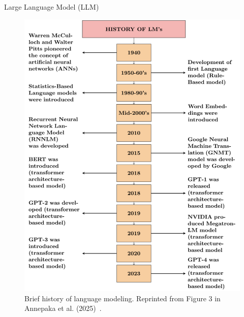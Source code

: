 \documentclass[12pt]{beamer}
\begin{document}
\begin{frame}[allowframebreaks]{Large Language Model (LLM)}
    \begin{figure}
        \centering
        \includegraphics[height=0.6\textheight]{figures/lm_history.png}
        \caption{Brief history of language modeling. Reprinted from Figure 3 in Annepaka et al. (2025)~\cite{Annepaka2025}.}
        \label{fig:Fig. 4}
    \end{figure}
\end{frame}
\end{document}
